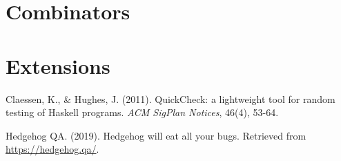 \documentclass{scrartcl}
\begin{document}
\section{Combinators}


\section{Extensions}


\begin{thebibliography}{99}

Claessen, K., \& Hughes, J. (2011). QuickCheck: a lightweight tool for random
testing of Haskell programs. \textit{ACM SigPlan Notices}, 46(4), 53-64.

Hedgehog QA. (2019). Hedgehog will eat all your bugs. Retrieved from
\url{https://hedgehog.qa/}.

\end{thebibliography}
\end{document}
